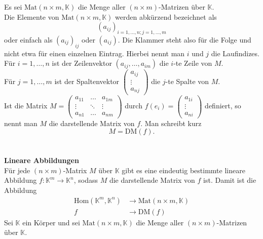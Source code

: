 \documentclass[a4paper,12pt]{article}
\begin{document}
Es sei $\text{Mat}\left(n\times m,\mathbb{K}\right)$ die Menge aller $\left(n\times m\right)$-Matrizen über $\mathbb{K}$.\\Die Elemente von $\text{Mat}\left(n\times m,\mathbb{K}\right)$ werden abkürzend bezeichnet als
\[ 
        \left(a_{ij}\right)_{i=1,\hdots ,n;j=1,\hdots ,m}
\] 
oder einfach als $\left(a_{ij}\right)_{ij}$ oder $\left(a_{ij}\right)$. Die Klammer steht also für die Folge und nicht etwa für einen einzelnen Eintrag. Hierbei nennt man $i$ und $j$ die Laufindizes.\\Für $i=1,\hdots ,n$ ist der Zeilenvektor $\left(a_{ij},\hdots ,a_{im}\right)$ die $i$-te Zeile von $M$.\\Für $j=1,\hdots ,m$ ist der Spaltenvektor $\left(\begin{matrix}
        a_{ij}\\\vdots\\a_{nj}
\end{matrix}\right)$ die $j$-te Spalte von $M$.\\Ist die Matrix $M=\left(\begin{matrix}
a_{11}&\hdots &a_{1m}\\
\vdots&\ddots &\vdots\\
a_{n1}&\hdots &a_{nm}
\end{matrix}\right)$ durch $f\left(e_i\right)=\left(\begin{matrix}
        a_{1i}\\\vdots\\a_{n i}
\end{matrix}\right)$ definiert, so nennt man $M$ die darstellende Matrix von $f$. Man schreibt kurz
\[ 
        M=\text{DM}\left(f\right)
.\] 
\\\hfill\\\textbf{Lineare Abbildungen}\\ 
Für jede $\left(n\times m\right)$-Matrix $M$ über $\mathbb{K}$ gibt es eine eindeutig bestimmte lineare Abbildung $f:\mathbb{K}^{m}\rightarrow \mathbb{K}^{n}$, sodass $M$ die darstellende Matrix von $f$ ist. Damit ist die Abbildung
\begin{align*}
        \text{Hom}\left(\mathbb{K}^{m},\mathbb{K}^{n}\right)&\rightarrow \text{Mat}\left(n\times m,\mathbb{K}\right)\\
        f&\rightarrow \text{DM}\left(f\right)
\end{align*}
Sei $\mathbb{K}$ ein Körper und sei $\text{Mat}\left(n\times m,\mathbb{K}\right)$ die Menge aller $\left(n\times m\right)$-Matrizen über $\mathbb{K}$.
\end{document}
